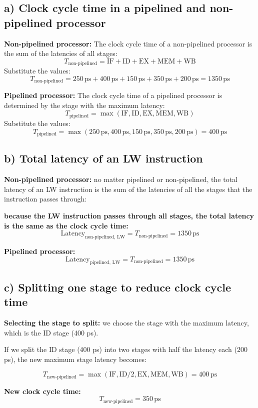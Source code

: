 \documentclass[cn,12pt]{homework}
\begin{document}
\begin{solution}



\subsection*{a) Clock cycle time in a pipelined and non-pipelined processor}

\textbf{Non-pipelined processor:}  
The clock cycle time of a non-pipelined processor is the sum of the latencies of all stages:  
\[
T_{\text{non-pipelined}} = \text{IF} + \text{ID} + \text{EX} + \text{MEM} + \text{WB}
\]  
Substitute the values:  
\[
T_{\text{non-pipelined}} = 250 \, \text{ps} + 400 \, \text{ps} + 150 \, \text{ps} + 350 \, \text{ps} + 200 \, \text{ps} = 1350 \, \text{ps}
\]

\textbf{Pipelined processor:}  
The clock cycle time of a pipelined processor is determined by the stage with the maximum latency:  
\[
T_{\text{pipelined}} = \max(\text{IF}, \text{ID}, \text{EX}, \text{MEM}, \text{WB})
\]  
Substitute the values:  
\[
T_{\text{pipelined}} = \max(250 \, \text{ps}, 400 \, \text{ps}, 150 \, \text{ps}, 350 \, \text{ps}, 200 \, \text{ps}) = 400 \, \text{ps}
\]

\subsection*{b) Total latency of an LW instruction}

\textbf{Non-pipelined processor:}  
no matter pipelined or non-pipelined, the total latency of an LW 
instruction is the sum of the latencies of all the stages that the instruction passes through:

\textbf{because the LW instruction passes through all stages, the total latency is the same as the clock cycle time:}\[
\text{Latency}_{\text{non-pipelined, LW}} = T_{\text{non-pipelined}} = 1350 \, \text{ps}
\]

\textbf{Pipelined processor:}  
\[
\text{Latency}_{\text{pipelined, LW}} = T_{\text{non-pipelined}} = 1350 \, \text{ps}
\]  

\subsection*{c) Splitting one stage to reduce clock cycle time}

\textbf{Selecting the stage to split:}  
we choose the stage with the maximum latency, which is the \(\text{ID}\) stage (400 ps).

If we split the \(\text{ID}\) stage (400 ps) into two stages with half the latency each (200 ps), the new maximum stage latency becomes:  

\[
T_{\text{new-pipelined}} = \max(\text{IF}, \text{ID/2}, \text{EX}, \text{MEM}, \text{WB})=400 \, \text{ps}
\]  

\textbf{New clock cycle time:}  
\[
T_{\text{new-pipelined}} = 350 \, \text{ps}
\]







\end{solution}
\newpage
\end{document}

